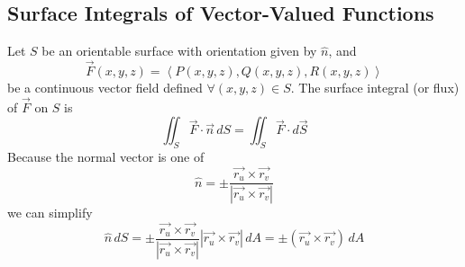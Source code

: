 \documentclass{article}
\newcommand{\vect}[1]{\ensuremath{\overrightarrow{#1}}}
\begin{document}
\subsection{Surface Integrals of Vector-Valued Functions}
Let $S$ be an orientable surface with orientation given by $\hat{n}$, and $$\vect{F}(x,y,z)=\left\langle P(x,y,z),Q(x,y,z),R(x,y,z)\right\rangle$$ be a continuous vector field defined $\forall (x,y,z)\in S$. The surface integral (or flux) of $\vect{F}$ on $S$ is
$$\iint_S\vect{F}\cdot\vect{n}\,dS=\iint_S\vect{F}\cdot d\vect{S}$$
Because the normal vector is one of
$$\hat{n}=\pm\frac{\vect{r_u}\times\vect{r_v}}{\left|\vect{r_u}\times\vect{r_v}\right|}$$
we can simplify
$$\hat{n}\,dS=\pm\frac{\vect{r_u}\times\vect{r_v}}{\left|\vect{r_u}\times\vect{r_v}\right|}\left|\vect{r_u}\times\vect{r_v}\right|\,dA=\pm\left(\vect{r_u}\times\vect{r_v}\right)\,dA$$
\end{document}
